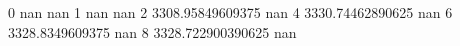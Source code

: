 0 nan nan
1 nan nan
2 3308.95849609375 nan
4 3330.74462890625 nan
6 3328.8349609375 nan
8 3328.722900390625 nan
